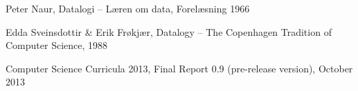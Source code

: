 \documentclass[11pt,a4paper]{article}
\begin{document}
\newpage
\begin{thebibliography}{9}
        Peter Naur,
        Datalogi -- Læren om data,
        Forelæsning 1966

        Edda Sveinsdottir \& Erik Frøkjær,
        Datalogy -- The Copenhagen Tradition of Computer Science,
        1988

        Computer Science Curricula 2013,
        Final Report 0.9 (pre-release version),
        October 2013
\end{thebibliography}
\end{document}
